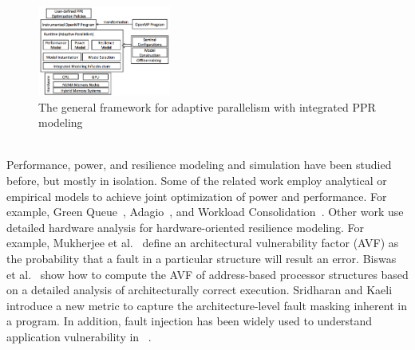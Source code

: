 \documentclass{article}  %
\begin{document}

\begin{figure}
\begin{center}
\includegraphics[width=0.39\textwidth]{figures/general_framework.png}
\end{center}
\caption{The general framework for adaptive parallelism with integrated PPR modeling}
\label{fig:general_framework}
\end{figure}

\vspace{10pt}

   \\
Performance, power, and resilience modeling and simulation have been
studied before, but mostly in isolation. Some of the related work employ
analytical or empirical models to achieve joint optimization of power
and performance. For example, Green Queue~\cite{sdscpower_hppac12,
  sdscpower_ccpe12, sdscpower_cgc12},  Adagio~\cite{rountree_sc07,
  rountree_ics09}, and Workload
Consolidation~\cite{taskconsolidation_ipdps10,   gpusolidation_srmpds11}. 
Other work use detailed hardware analysis for hardware-oriented resilience modeling. 
For example, Mukherjee et al.~\cite{avf_micro03} define an
architectural vulnerability factor (AVF) as the probability that a
fault in a particular structure will result an error. Biswas et
al.~\cite{avf_isca05} show how to compute the AVF of address-based
processor structures based on a detailed analysis of architecturally
correct execution. Sridharan and Kaeli~\cite{pvf_selse10, pvf_hpca09}
introduce a new metric to capture the architecture-level fault masking
inherent in a program. In addition, fault injection has been
widely used to understand application vulnerability in  
~\cite{li:2012:classifying, multigrid_ics12, fj_asplos12, fj_dns12,
  lanl_fi_europar11}.
\end{document}
